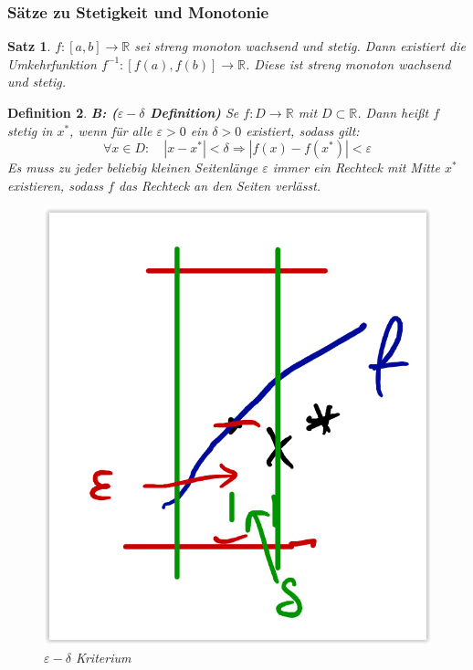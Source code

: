 \documentclass[12pt,a4paper]{article}%
\newtheorem{satz}{Satz}[section]
\newtheorem{definition}[satz]{Definition}
\numberwithin{equation}{section}
\newcommand{\R}{\mathbb{R}} %
\numberwithin{equation}{subsection}
\begin{document}
  \subsubsection{Sätze zu Stetigkeit und Monotonie}
  \begin{satz}
    $f:[a,b] \rightarrow \R$ sei streng monoton wachsend und  stetig. Dann existiert die Umkehrfunktion $f^{-1}:[f(a),f(b)]\rightarrow \R$. Diese ist streng monoton wachsend und stetig.
  \end{satz}
  \begin{definition}
    \textbf{B: ($\varepsilon -\delta$ Definition)} \newline
    Se $f:D\rightarrow \R$ mit $D \subset \R$. Dann heißt $f$ stetig in $x^*$, wenn für alle $\varepsilon > 0$ ein $\delta > 0$ existiert, sodass gilt: 
    \begin{equation}
      \forall x \in D:\quad |x - x^*| < \delta \Rightarrow |f(x) - f(x^*)| < \varepsilon
    \end{equation}
    Es muss zu jeder beliebig kleinen Seitenlänge $\varepsilon$ immer ein Rechteck mit Mitte $x^*$ existieren, sodass $f$ das Rechteck an den Seiten verlässt.
    \begin{figure}[H] 
			\centering
			\captionsetup{justification=centering}
			\includegraphics[width=0.2\linewidth]{stetigkeit_eps_del.png}
			\caption{$\varepsilon - \delta$ Kriterium \protect\cite{HM12}}
			\label{fig:stetigkeit_eps_del}
    \end{figure} \label{def:stet_b}
  \end{definition}
  
\end{document}

